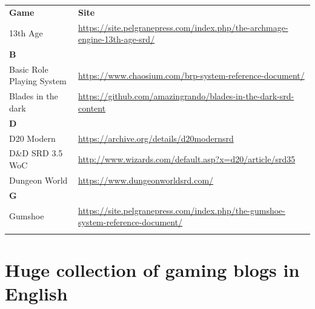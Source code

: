\documentclass[a4paper, 11pt, twoside]{article}
\begin{document}
\begin{longtable}{lp{10cm}}
\textbf{Game} & \textbf{Site}\\
13th Age & \url{https://site.pelgranepress.com/index.php/the-archmage-engine-13th-age-srd/}\\
\textbf{B} & \\
Basic Role Playing System & \url{https://www.chaosium.com/brp-system-reference-document/}\\
Blades in the dark & \url{https://github.com/amazingrando/blades-in-the-dark-srd-content}\\
\textbf{D} & \\
D20 Modern & \url{https://archive.org/details/d20modernsrd}\\
D\&D SRD 3.5 WoC & \url{http://www.wizards.com/default.asp?x=d20/article/srd35}\\
Dungeon World & \url{https://www.dungeonworldsrd.com/}\\
\textbf{G} & \\
Gumshoe & \url{https://site.pelgranepress.com/index.php/the-gumshoe-system-reference-document/}\\
 & \\
\end{longtable}

\section{Huge collection of gaming blogs in English}
\label{sec:orgfb67f79}
\end{document}
